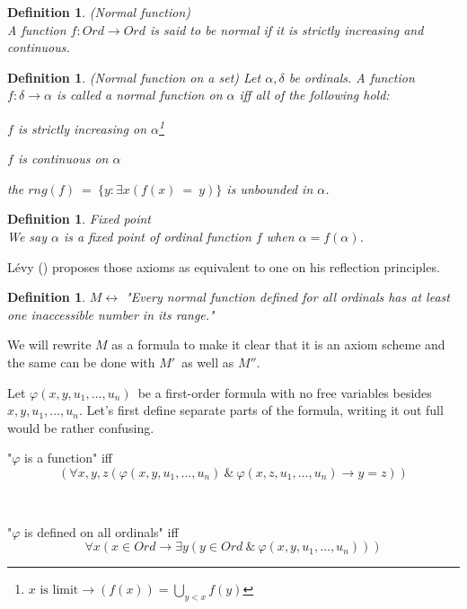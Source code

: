 \documentclass[12pt,a4paper]{article}
\newtheorem{definition}[theorem]{Definition}
\renewcommand{\iff}{\leftrightarrow}
\newcommand{\then}{\rightarrow}
\newcommand{\bce}{\begin{compactenum}}
\newcommand{\ece}{\end{compactenum}}
\begin{document}
\begin{definition}{(Normal function)}\label{def:normal_function}\\
A function $f: Ord \then Ord$ is said to be \emph{normal} if it is \emph{strictly increasing} and \emph{continuous}.
\end{definition}

\begin{definition}{(Normal function on a set)} Let $\alpha, \delta$ be ordinals. A function $f: \delta \then \alpha$ is called a \emph{normal function on $\alpha$} iff all of the following hold:
\bce[(i)]
\item $f$ is strictly increasing on $\alpha$\footnote{$x \mbox{ is limit} \then (f(x)) = \bigcup_{y < x} f(y)$}
\item $f$ is continuous on $\alpha$
\item the $rng(f)\ =\ \{y: \exists x(f(x)\ =\ y)\}$ is unbounded in $\alpha$.
 \ece
\end{definition} %

\begin{definition}{Fixed point}\\
We say $\alpha$ is a fixed point of ordinal function $f$ when $\alpha=f(\alpha)$.
\end{definition}


Lévy (\cite{Levy60a}) proposes those axioms as equivalent to one on his reflection principles.
\begin{definition}
$M \iff$ "Every normal function defined for all ordinals has at least one inaccessible number in its range."
\end{definition}
We will rewrite $M$ as a formula to make it clear that it is an axiom scheme and the same can be done with $M'$ as well as $M''$.

Let $\varphi(x, y, u_1, \ldots, u_n)$ be a first-order formula with no free variables besides $x, y, u_1, \ldots, u_n$. Let's first define separate parts of the formula, writing it out full would be rather confusing.


"$\varphi$ is a function" iff
\begin{equation}
(\forall x, y, z (\varphi(x, y, u_1, \ldots, u_n)\ \&\ \varphi(x, z, u_1, \ldots, u_n) \then y=z))
\end{equation}

\

"$\varphi$ is defined on all ordinals" iff
\begin{equation}
\forall x (x \in Ord \then \exists y(y \in Ord\ \&\ \varphi(x, y, u_1, \ldots, u_n)))
\end{equation}
\end{document}
